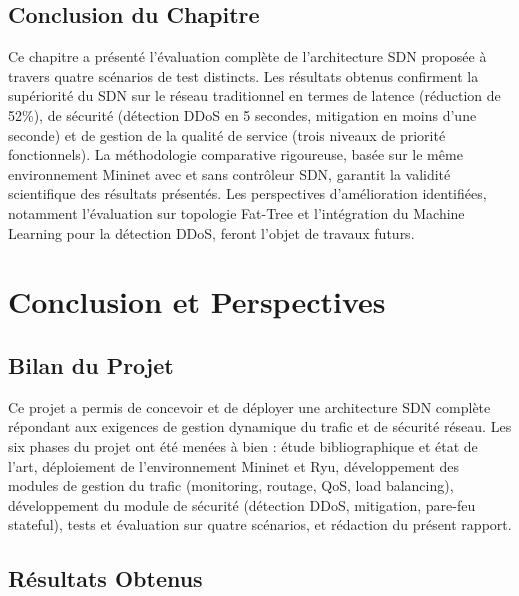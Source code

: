 \documentclass[12pt,a4paper]{report}
\begin{document}
\section{Conclusion du Chapitre}
Ce chapitre a présenté l'évaluation complète de l'architecture
SDN proposée à travers quatre scénarios de test distincts.
Les résultats obtenus confirment la supériorité du SDN sur
le réseau traditionnel en termes de latence (réduction de 52\%),
de sécurité (détection DDoS en 5 secondes, mitigation en moins
d'une seconde) et de gestion de la qualité de service (trois
niveaux de priorité fonctionnels). La méthodologie comparative
rigoureuse, basée sur le même environnement Mininet avec et
sans contrôleur SDN, garantit la validité scientifique des
résultats présentés. Les perspectives d'amélioration identifiées,
notamment l'évaluation sur topologie Fat-Tree et l'intégration
du Machine Learning pour la détection DDoS, feront l'objet
de travaux futurs.
\newpage

\chapter{Conclusion et Perspectives}

\section{Bilan du Projet}
Ce projet a permis de concevoir et de déployer une
architecture SDN complète répondant aux exigences de
gestion dynamique du trafic et de sécurité réseau.
Les six phases du projet ont été menées à bien : étude
bibliographique et état de l'art, déploiement de
l'environnement Mininet et Ryu, développement des modules
de gestion du trafic (monitoring, routage, QoS, load
balancing), développement du module de sécurité (détection
DDoS, mitigation, pare-feu stateful), tests et évaluation
sur quatre scénarios, et rédaction du présent rapport.

\section{Résultats Obtenus}
\end{document}
